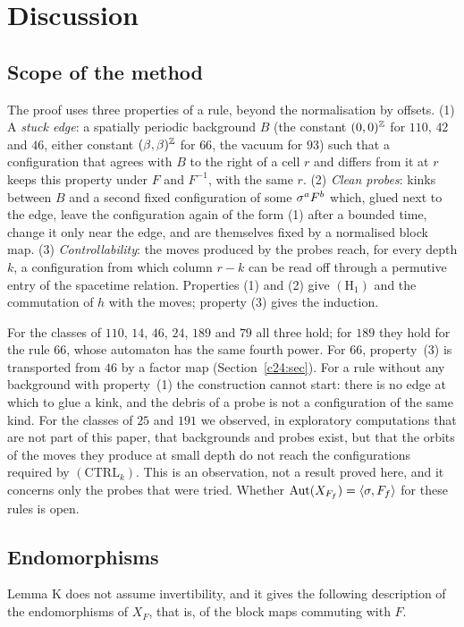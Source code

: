 \section{Discussion}\label{sec:disc}

\subsection{Scope of the method}\label{sec:scope}
The proof uses three properties of a rule, beyond the normalisation by offsets. (1) A \emph{stuck edge}: a spatially periodic background $B$ (the constant $(0,0)^{\mathbb{Z}}$ for $110$, $42$ and $46$, either constant $(\beta,\beta)^{\mathbb{Z}}$ for $66$, the vacuum for $93$) such that a configuration that agrees with $B$ to the right of a cell $r$ and differs from it at $r$ keeps this property under $F$ and $F^{-1}$, with the same $r$. (2) \emph{Clean probes}: kinks between $B$ and a second fixed configuration of some $\sigma^aF^b$ which, glued next to the edge, leave the configuration again of the form (1) after a bounded time, change it only near the edge, and are themselves fixed by a normalised block map. (3) \emph{Controllability}: the moves produced by the probes reach, for every depth $k$, a configuration from which column $r-k$ can be read off through a permutive entry of the spacetime relation. Properties (1) and (2) give $(\mathrm H_1)$ and the commutation of $h$ with the moves; property (3) gives the induction.

For the classes of $110$, $14$, $46$, $24$, $189$ and $79$ all three hold; for $189$ they hold for the rule $66$, whose automaton has the same fourth power. For $66$, property~(3) is transported from $46$ by a factor map (Section~\ref{c24:sec}). For a rule without any background with property~(1) the construction cannot start: there is no edge at which to glue a kink, and the debris of a probe is not a configuration of the same kind. For the classes of $25$ and $191$ we observed, in exploratory computations that are not part of this paper, that backgrounds and probes exist, but that the orbits of the moves they produce at small depth do not reach the configurations required by $(\mathrm{CTRL}_k)$. This is an observation, not a result proved here, and it concerns only the probes that were tried. Whether $\operatorname{Aut}(X_{F_f})=\langle\sigma,F_f\rangle$ for these rules is open.

\subsection{Endomorphisms}\label{sec:End}
Lemma K does not assume invertibility, and it gives the following description of the endomorphisms of $X_F$, that is, of the block maps commuting with $F$.

